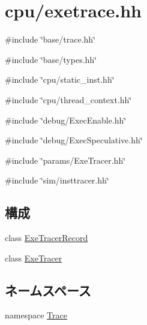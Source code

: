 \hypertarget{exetrace_8hh}{
\section{cpu/exetrace.hh}
\label{exetrace_8hh}
}
{\ttfamily \#include \char`\"{}base/trace.hh\char`\"{}}\par
{\ttfamily \#include \char`\"{}base/types.hh\char`\"{}}\par
{\ttfamily \#include \char`\"{}cpu/static\_\-inst.hh\char`\"{}}\par
{\ttfamily \#include \char`\"{}cpu/thread\_\-context.hh\char`\"{}}\par
{\ttfamily \#include \char`\"{}debug/ExecEnable.hh\char`\"{}}\par
{\ttfamily \#include \char`\"{}debug/ExecSpeculative.hh\char`\"{}}\par
{\ttfamily \#include \char`\"{}params/ExeTracer.hh\char`\"{}}\par
{\ttfamily \#include \char`\"{}sim/insttracer.hh\char`\"{}}\par
\subsection*{構成}
\begin{DoxyCompactItemize}
\item 
class \hyperlink{classTrace_1_1ExeTracerRecord}{ExeTracerRecord}
\item 
class \hyperlink{classTrace_1_1ExeTracer}{ExeTracer}
\end{DoxyCompactItemize}
\subsection*{ネームスペース}
\begin{DoxyCompactItemize}
\item 
namespace \hyperlink{namespaceTrace}{Trace}
\end{DoxyCompactItemize}
